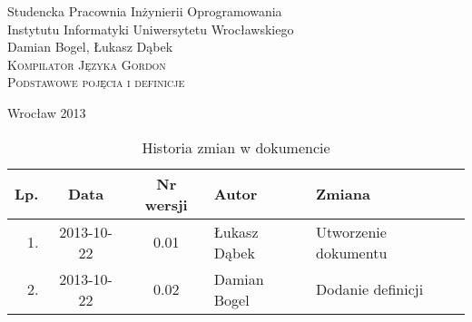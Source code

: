 \documentclass{documentation}
\begin{document}
\begin{titlepage}
\begin{center}
Studencka Pracownia Inżynierii Oprogramowania\\
Instytutu Informatyki Uniwersytetu Wrocławskiego\\[6cm]

Damian Bogel, Łukasz Dąbek\\[1cm]
\textsc{\LARGE Kompilator Języka Gordon}\\[0.5cm]
\textsc{\large Podstawowe pojęcia i definicje}

\vfill
Wrocław 2013 \\[2.5cm]

\end{center}
\end{titlepage}

\newpage
\begin{table}
	\centering
	\caption{Historia zmian w dokumencie}
		\begin{tabular}{|r|c|c|l|l|}
		\hline
		Lp.  & Data       & Nr wersji & Autor                 & Zmiana \\ \hline
		1.   & 2013-10-22 & 0.01 & Łukasz Dąbek & Utworzenie dokumentu \\ \hline
        2.   & 2013-10-22 & 0.02 & Damian Bogel & Dodanie definicji \\ \hline
	\end{tabular}
\end{table}
\newpage

\tableofcontents
\setcounter{page}{2}

\newpage
\end{document}
